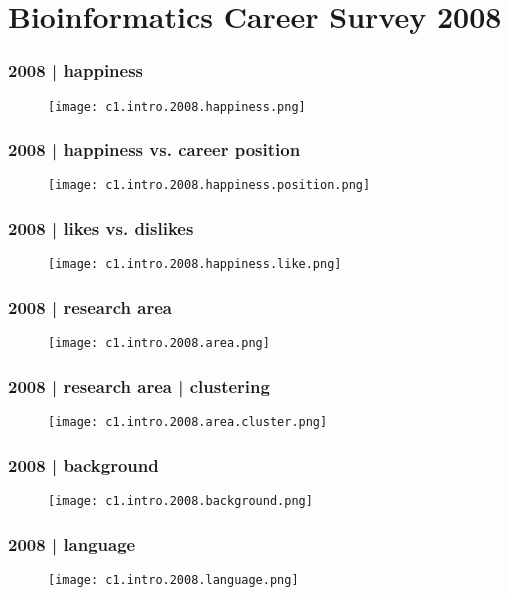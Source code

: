 \section{Bioinformatics Career Survey 2008}
\begin{frame}
  \frametitle{2008 | happiness}
   \begin{figure}
     \centering
     \texttt{[image: c1.intro.2008.happiness.png]}
   \end{figure} 
\end{frame}

\begin{frame}
  \frametitle{2008 | happiness vs. career position}
   \begin{figure}
     \centering
     \texttt{[image: c1.intro.2008.happiness.position.png]}
   \end{figure} 
\end{frame}

\begin{frame}
  \frametitle{2008 | likes vs. dislikes}
   \begin{figure}
     \centering
     \texttt{[image: c1.intro.2008.happiness.like.png]}
   \end{figure} 
\end{frame}

\begin{frame}
  \frametitle{2008 | research area}
   \begin{figure}
     \centering
     \texttt{[image: c1.intro.2008.area.png]}
   \end{figure} 
\end{frame}

\begin{frame}
  \frametitle{2008 | research area | clustering}
   \begin{figure}
     \centering
     \texttt{[image: c1.intro.2008.area.cluster.png]}
   \end{figure} 
\end{frame}

\begin{frame}
  \frametitle{2008 | background}
   \begin{figure}
     \centering
     \texttt{[image: c1.intro.2008.background.png]}
   \end{figure} 
\end{frame}

\begin{frame}
  \frametitle{2008 | language}
   \begin{figure}
     \centering
     \texttt{[image: c1.intro.2008.language.png]}
   \end{figure} 
\end{frame}

